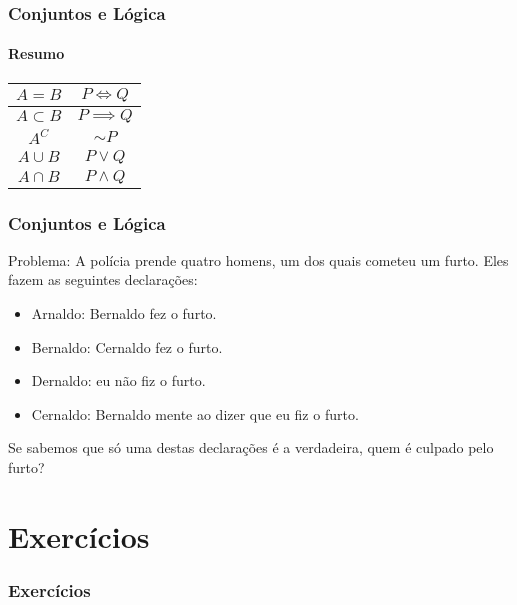 \documentclass[brazil, notheorems, 10pt]{beamer}
\begin{document}
\begin{frame}
\frametitle{Conjuntos e Lógica} \framesubtitle{Resumo}
\begin{center}
\begin{tabular}{|c|c|}
	\hline
	$A=B$ & $P \iff Q$ \\ \hline
	$A \subset B$ & $P \implies Q$ \\ \hline
	$A^C$ & $\sim P$ \\ \hline
	$A \cup B$ & $P \lor Q$ \\ \hline
	$A \cap B$ & $P \land Q$ \\
	\hline
\end{tabular}
\end{center}
\end{frame}

\begin{frame}
\frametitle{Conjuntos e Lógica} %
Problema: A
polícia prende quatro homens, um dos quais cometeu um furto. Eles fazem
as seguintes declarações:
\begin{itemize}
	\item Arnaldo: Bernaldo fez o furto.
	\item Bernaldo: Cernaldo fez o furto.
	\item Dernaldo: eu não fiz o furto.
	\item Cernaldo: Bernaldo mente ao dizer que eu fiz o furto.
\end{itemize}
Se sabemos que só uma destas declarações é a verdadeira, quem é
culpado pelo furto?

\end{frame}

\section{Exercícios}

\begin{frame}
\frametitle{Exercícios}



\end{frame}
\end{document}
